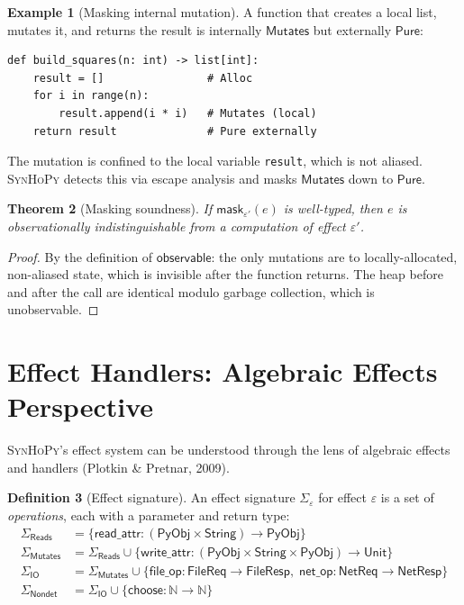 \documentclass[11pt,a4paper]{report}
\theoremstyle{definition}
\newtheorem{definition}{Definition}[chapter]
\newtheorem{example}[definition]{Example}
\theoremstyle{plain}
\newtheorem{theorem}[definition]{Theorem}
\newcommand{\Nat}{\mathbb{N}}
\newcommand{\PyObj}{\mathsf{PyObj}}
\newcommand{\Pure}{\mathsf{Pure}}
\newcommand{\Reads}{\mathsf{Reads}}
\newcommand{\Mutates}{\mathsf{Mutates}}
\newcommand{\IO}{\mathsf{IO}}
\newcommand{\Nondet}{\mathsf{Nondet}}
\newcommand{\synhopy}{\textsc{SynHoPy}}
\begin{document}
\begin{example}[Masking internal mutation]
A function that creates a local list, mutates it, and returns the result is
internally $\Mutates$ but externally $\Pure$:
\begin{lstlisting}[style=python]
def build_squares(n: int) -> list[int]:
    result = []                # Alloc
    for i in range(n):
        result.append(i * i)   # Mutates (local)
    return result              # Pure externally
\end{lstlisting}
The mutation is confined to the local variable \lstinline[style=python]{result},
which is not aliased.  \synhopy{} detects this via escape analysis and masks
$\Mutates$ down to $\Pure$.
\end{example}

\begin{theorem}[Masking soundness]
If $\mathsf{mask}_{\varepsilon'}(e)$ is well-typed, then $e$ is
observationally indistinguishable from a computation of effect $\varepsilon'$.
\end{theorem}
\begin{proof}
By the definition of $\mathsf{observable}$: the only mutations are to
locally-allocated, non-aliased state, which is invisible after the function
returns.  The heap before and after the call are identical modulo garbage
collection, which is unobservable.
\end{proof}


\section{Effect Handlers: Algebraic Effects Perspective}

\synhopy{}'s effect system can be understood through the lens of algebraic
effects and handlers (Plotkin \& Pretnar, 2009).

\begin{definition}[Effect signature]
An effect signature $\Sigma_\varepsilon$ for effect $\varepsilon$ is a set of
\emph{operations}, each with a parameter and return type:
\begin{align}
  \Sigma_\Reads &= \{ \mathsf{read\_attr} : (\PyObj \times \mathsf{String}) \to \PyObj \} \\
  \Sigma_\Mutates &= \Sigma_\Reads \cup \{ \mathsf{write\_attr} : (\PyObj \times \mathsf{String} \times \PyObj) \to \mathsf{Unit} \} \\
  \Sigma_\IO &= \Sigma_\Mutates \cup \{ \mathsf{file\_op} : \mathsf{FileReq} \to \mathsf{FileResp},\;
    \mathsf{net\_op} : \mathsf{NetReq} \to \mathsf{NetResp} \} \\
  \Sigma_\Nondet &= \Sigma_\IO \cup \{ \mathsf{choose} : \Nat \to \Nat \}
\end{align}
\end{definition}
\end{document}
